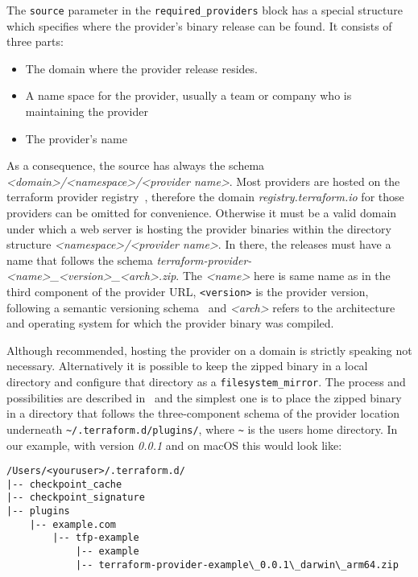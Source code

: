 \documentclass[paper=a4,11pt,numbers=noenddot]{article}
\begin{document}
The \verb'source' parameter in the \verb'required_providers' block has a special structure which specifies where the provider's binary release can be found. It consists of three parts:

\begin{itemize}
\item The domain where the provider release resides.
\item A name space for the provider, usually a team or company who is maintaining the provider
\item The provider's name
\end{itemize}

As a consequence, the source has always the schema \emph{<domain>/<namespace>/<provider name>}. Most providers are hosted on the terraform provider registry~\autocite{noauthor_terraform_registry_nodate}, therefore the domain \emph{registry.terraform.io} for those providers can be omitted for convenience. Otherwise it must be a valid domain under which a web server is hosting the provider binaries within the directory structure \emph{<namespace>/<provider name>}. In there, the releases must have a name that follows the schema \emph{terraform-provider-<name>\_<version>\_<arch>.zip}. The \emph{<name>} here is same name as in the third component of the provider URL, \verb'<version>' is the provider version, following a semantic versioning schema~\autocite{preston-werner_semantic_versioning_nodate} and \emph{<arch>} refers to the architecture and operating system for which the provider binary was compiled.

Although recommended, hosting the provider on a domain is strictly speaking not necessary. Alternatively it is possible to keep the zipped binary in a local directory and configure that directory as a \verb'filesystem_mirror'. The process and possibilities are described in~\autocite{noauthor_terraform_provider_installation_nodate} and the simplest one is to place the zipped binary in a directory that follows the three-component schema of the provider location underneath \verb'~/.terraform.d/plugins/', where \verb'~' is the users home directory. In our example, with version \emph{0.0.1} and on macOS this would look like:

\begin{lstlisting}
/Users/<youruser>/.terraform.d/
|-- checkpoint_cache
|-- checkpoint_signature
|-- plugins
    |-- example.com
        |-- tfp-example
            |-- example
            |-- terraform-provider-example\_0.0.1\_darwin\_arm64.zip
\end{lstlisting}
\end{document}
